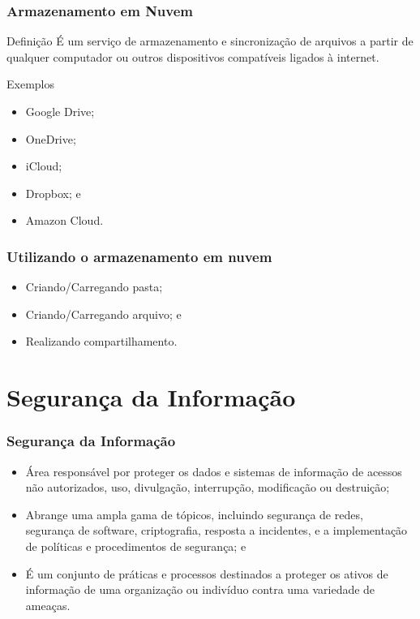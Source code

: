 \documentclass[aspectratio=169]{beamer} %
\begin{document}
\begin{frame}
	\frametitle{Armazenamento em Nuvem}
	
	\begin{block}{Defini\c cão}
		É um serviço de armazenamento e sincronização de arquivos a partir de qualquer computador ou outros dispositivos compatíveis ligados à internet.
	\end{block} \vfill
	
	\begin{exampleblock}{Exemplos}
		\begin{itemize}
			\item Google Drive;
			\item OneDrive;
			\item iCloud; 
			\item Dropbox; e
			\item Amazon Cloud.
		\end{itemize}
	\end{exampleblock}
\end{frame}

\begin{frame}
	\frametitle{Utilizando o armazenamento em nuvem}
	
	\begin{itemize}
		\item Criando/Carregando pasta;
		\item Criando/Carregando arquivo; e
		\item Realizando compartilhamento.
	\end{itemize}
\end{frame}


\section{Segurança da Informação}

\begin{frame}
	\frametitle{Segurança da Informação}
	
	\begin{itemize}
		\item Área responsável por proteger os dados e sistemas de informação de acessos não autorizados, uso, divulgação, interrupção, modificação ou destruição;
		\item Abrange uma ampla gama de tópicos, incluindo segurança de redes, segurança de software, criptografia, resposta a incidentes, e a implementação de políticas e procedimentos de segurança; e
		\item É um conjunto de práticas e processos destinados a proteger os ativos de informação de uma organização ou indivíduo contra uma variedade de ameaças.
	\end{itemize}
\end{frame}
\end{document}
